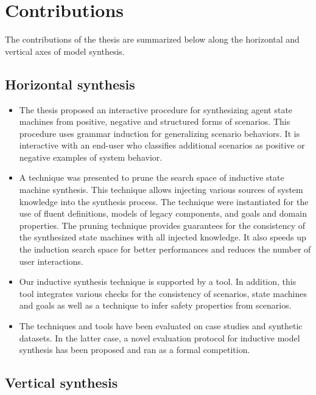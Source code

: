 \section{Contributions\label{section:conclusion-contributions}}

The contributions of the thesis are summarized below along the horizontal and vertical axes of model synthesis.

\subsection*{Horizontal synthesis}

\begin{itemize}
\item The thesis proposed an interactive procedure for synthesizing agent state machines from positive, negative and structured forms of scenarios. This procedure uses grammar induction for generalizing scenario behaviors. It is interactive with an end-user who classifies additional scenarios as positive or negative examples of system behavior.
\item A technique was presented to prune the search space of inductive state machine synthesis. This technique allows injecting various sources of system knowledge into the synthesis process. The technique were instantiated for the use of fluent definitions, models of legacy components, and goals and domain properties. The pruning technique provides guarantees for the consistency of the synthesized state machines with all injected knowledge. It also speeds up the induction search space for better performances and reduces the number of user interactions.
\item Our inductive synthesis technique is supported by a tool. In addition, this tool integrates various checks for the consistency of scenarios, state machines and goals as well as a technique to infer safety properties from scenarios. 
\item The techniques and tools have been evaluated on case studies and synthetic datasets. In the latter case, a novel evaluation protocol for inductive model synthesis has been proposed and ran as a formal competition.
\end{itemize}

\subsection*{Vertical synthesis}

